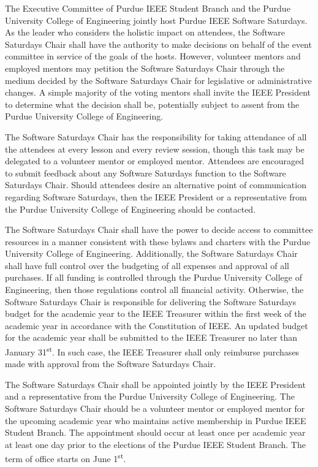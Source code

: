\documentclass[12pt]{constitution}
\newcommand{\datetermstart}{June 1\textsuperscript{st}} %
\begin{document}
\label{art:procedure}

The Executive Committee of Purdue IEEE Student Branch and the Purdue University College of Engineering jointly host Purdue IEEE Software Saturdays. As the leader who considers the holistic impact on attendees, the Software Saturdays Chair shall have the authority to make decisions on behalf of the event committee in service of the goals of the hosts. However, volunteer mentors and employed mentors may petition the Software Saturdays Chair through the medium decided by the Software Saturdays Chair for legislative or administrative changes. A simple majority of the voting mentors shall invite the IEEE President to determine what the decision shall be, potentially subject to assent from the Purdue University College of Engineering.

The Software Saturdays Chair has the responsibility for taking attendance of all the attendees at every lesson and every review session, though this task may be delegated to a volunteer mentor or employed mentor. Attendees are encouraged to submit feedback about any Software Saturdays function to the Software Saturdays Chair. Should attendees desire an alternative point of communication regarding Software Saturdays, then the IEEE President or a representative from the Purdue University College of Engineering should be contacted.

The Software Saturdays Chair shall have the power to decide access to committee resources in a manner consistent with these bylaws and charters with the Purdue University College of Engineering. Additionally, the Software Saturdays Chair shall have full control over the budgeting of all expenses and approval of all purchases. If all funding is controlled through the Purdue University College of Engineering, then those regulations control all financial activity. Otherwise, the Software Saturdays Chair is responsible for delivering the Software Saturdays budget for the academic year to the IEEE Treasurer within the first week of the academic year in accordance with the Constitution of IEEE. An updated budget for the academic year shall be submitted to the IEEE Treasurer no later than January 31\textsuperscript{st}. In such case, the IEEE Treasurer shall only reimburse purchases made with approval from the Software Saturdays Chair.


\label{art:change}

The Software Saturdays Chair shall be appointed jointly by the IEEE President and a representative from the Purdue University College of Engineering. The Software Saturdays Chair should be a volunteer mentor or employed mentor for the upcoming academic year who maintains active membership in Purdue IEEE Student Branch. The appointment should occur at least once per academic year at least one day prior to the elections of the Purdue IEEE Student Branch. The term of office starts on \datetermstart{}.
\end{document}
